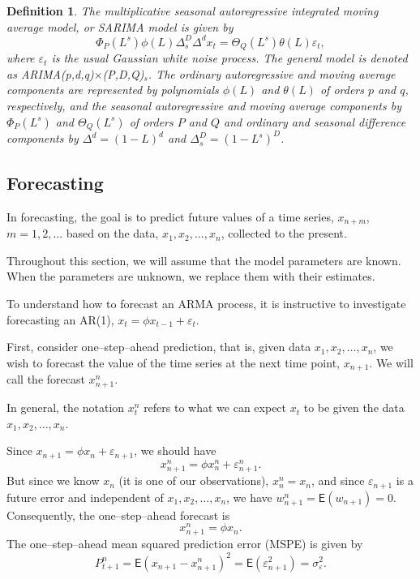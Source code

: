 \documentclass[
paper=128mm:96mm, %
fontsize=9.5pt, %
pagesize, %
parskip=half-, %
]{scrartcl} %
\theoremstyle{mythmstyle} %
\newtheorem{definition}[theorem]{Definition} %
\begin{document}
\begin{definition}
The multiplicative seasonal autoregressive integrated moving average model, or SARIMA model is given by
%
\begin{equation}
\Phi_P(L^s)\phi(L)\Delta_s^D\Delta^dx_t=\Theta_Q(L^s)\theta(L)\varepsilon_t,\nonumber
\end{equation}
%
where $\varepsilon_t$ is the usual Gaussian white noise process. The general model is denoted as ARIMA(p,d,q)$\times$(P,D,Q)$_s$. The ordinary autoregressive and moving average components are represented by polynomials $\phi(L)$ and $\theta(L)$ of orders $p$ and $q$, respectively, and the seasonal autoregressive and moving average components by $\Phi_P(L^s)$ and $\Theta_Q(L^s)$ of orders $P$ and $Q$ and ordinary and seasonal difference components by $\Delta^d=(1-L)^d$ and $\Delta_s^D=(1-L^s)^D$.
\end{definition}
\clearpage

\subsection{Forecasting}

In forecasting, the goal is to predict future values of a time series, $x_{n+m}$,
$m=1,2,\dots$ based on the data, $x_1,x_2,\dots,x_n$, collected to the present. 

Throughout this section, we will assume that the model parameters are known. When the parameters are unknown, we replace them with their estimates.

To understand how to forecast an ARMA process, it is instructive to investigate forecasting an AR(1), $x_t=\phi x_{t-1}+\varepsilon_t$.

First, consider one--step--ahead prediction, that is, given data $x_1,x_2,\dots,x_n$, we wish to forecast the value of the time series at the next time point, $x_{n+1}$. We will call the forecast $x^n_{n+1}$. 

In general, the notation $x^n_t$ refers to what we can expect $x_t$ to be given the data $x_1,x_2,\dots,x_n$. 
\clearpage


Since $x_{n+1}=\phi x_{n}+\varepsilon_{n+1}$, we should have
%
\begin{equation}
x_{n+1}^n=\phi x^n_{n}+\varepsilon^n_{n+1}.
\end{equation}
%
But since we know $x_n$ (it is one of our observations), $x_n^n = x_n$, and since $\varepsilon_{n+1}$ is a future error and independent of $x_1,x_2,\dots,x_n$, we have $w^n_{n+1} = \mathsf{E}(w_{n+1}) = 0$. Consequently, the one--step--ahead forecast is
%
\begin{equation}
x_{n+1}^n=\phi x_n.
\end{equation}
%
The one--step--ahead mean squared prediction error (MSPE) is given by 
%
\begin{equation}
P_{t+1}^n=\mathsf{E}\left(x_{n+1}-x_{n+1}^n\right)^2=\mathsf{E}\left(\varepsilon^2_{n+1}\right)=\sigma^2_\varepsilon.
\end{equation}
%
\clearpage
\end{document}
